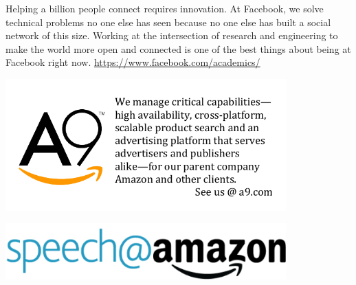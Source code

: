 Helping a billion people connect requires innovation. At Facebook, we
solve technical problems no one else has seen because no one else has
built a social network of this size. Working at the intersection of
research and engineering to make the world more open and connected is
one of the best things about being at Facebook right
now. \url{https://www.facebook.com/academics/}



\vfill

\includegraphics[width=4.25in]{content/ads/silver/A9-Ad.pdf}

\newpage
\thispagestyle{empty}

\includegraphics[width=4.25in]{content/ads/gold/Amazon.png}


